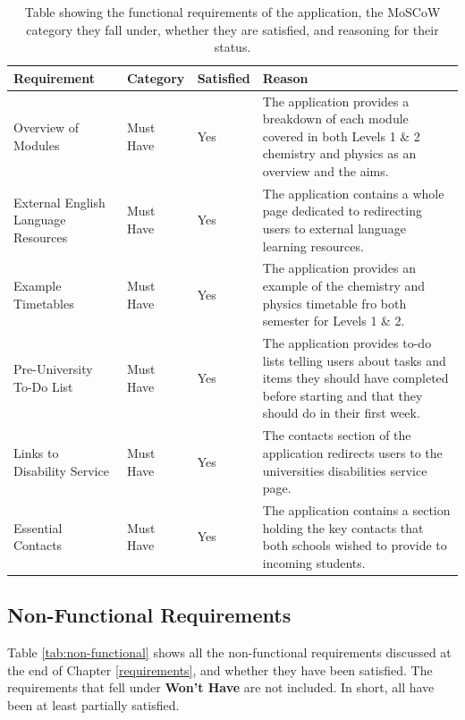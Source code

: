 \documentclass{l4proj}
\begin{document}
\begin{table}[ht]
    \caption{Table showing the functional requirements of the application,  the MoSCoW category they fall under,  whether they are satisfied,  and reasoning for their status. }\label{tab:functional}
    \begin{tabular}{ m{3cm}  m{2cm}  m{1.5cm}  m{17em} }
    \hline
    \textbf{Requirement}    & \textbf{Category}                & \textbf{Satisfied}      & \textbf{Reason}                      \\ %
    \hline
    
    Overview of Modules  &  Must Have              & Yes                 & The application provides a breakdown of each module covered in both Levels 1 \& 2 chemistry and physics as an overview and the aims. \\

    External English Language Resources & Must Have & Yes & The application contains a whole page dedicated to redirecting users to external language learning resources. \\

    Example Timetables & Must Have & Yes & The application provides an example of the chemistry and physics timetable fro both semester for Levels 1 \& 2. \\

    Pre-University To-Do List & Must Have & Yes & The application provides to-do lists telling users about tasks and items they should have completed before starting and that they should do in their first week. \\
    
    Links to Disability Service & Must Have & Yes & The contacts section of the application redirects users to the universities disabilities service page. \\
    
    Essential Contacts & Must Have & Yes & The application contains a section holding the key contacts that both schools wished to provide to incoming students.

    \end{tabular}
\end{table}

\subsection{Non-Functional Requirements}
Table \ref{tab:non-functional} shows all the non-functional requirements discussed at the end of Chapter \ref{requirements},  and whether they have been satisfied. The requirements that fell under \textbf{Won't Have} are not included. In short,  all have been at least partially satisfied.
\end{document}
